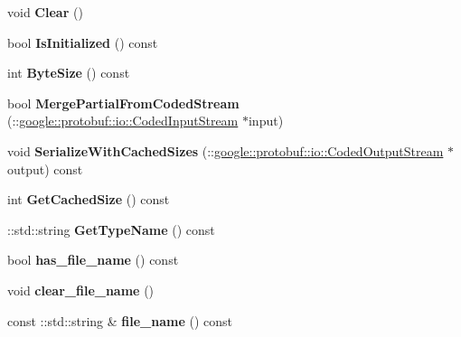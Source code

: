 \begin{DoxyCompactItemize}
void {\bfseries Clear} ()
\item 
\mbox{\label{classruntime_1_1FileSendProtos_a57a59f457a540da77a5b167a86489486}} 
bool {\bfseries Is\+Initialized} () const
\item 
\mbox{\label{classruntime_1_1FileSendProtos_ac11c92481ff9e358556509a06352def6}} 
int {\bfseries Byte\+Size} () const
\item 
\mbox{\label{classruntime_1_1FileSendProtos_a541871d79b6dd8aa778f00057e098798}} 
bool {\bfseries Merge\+Partial\+From\+Coded\+Stream} (\+::\hyperlink{classgoogle_1_1protobuf_1_1io_1_1CodedInputStream}{google\+::protobuf\+::io\+::\+Coded\+Input\+Stream} $\ast$input)
\item 
\mbox{\label{classruntime_1_1FileSendProtos_acb7fd1690f7142d32741fa742cdc2eed}} 
void {\bfseries Serialize\+With\+Cached\+Sizes} (\+::\hyperlink{classgoogle_1_1protobuf_1_1io_1_1CodedOutputStream}{google\+::protobuf\+::io\+::\+Coded\+Output\+Stream} $\ast$output) const
\item 
\mbox{\label{classruntime_1_1FileSendProtos_ae7f33111c537389f9d31f4171348592a}} 
int {\bfseries Get\+Cached\+Size} () const
\item 
\mbox{\label{classruntime_1_1FileSendProtos_a8acca31e4bd0f9d36f73a6a8412e3139}} 
\+::std\+::string {\bfseries Get\+Type\+Name} () const
\item 
\mbox{\label{classruntime_1_1FileSendProtos_a0610c08d78461f5689e7805fe6b5f5d8}} 
bool {\bfseries has\+\_\+file\+\_\+name} () const
\item 
\mbox{\label{classruntime_1_1FileSendProtos_ae75e03d2188dc7916aac6ad600044c97}} 
void {\bfseries clear\+\_\+file\+\_\+name} ()
\item 
\mbox{\label{classruntime_1_1FileSendProtos_a40b9e640106f4755f1b57139eeeae14b}} 
const \+::std\+::string \& {\bfseries file\+\_\+name} () const
\item 

\end{DoxyCompactItemize}
